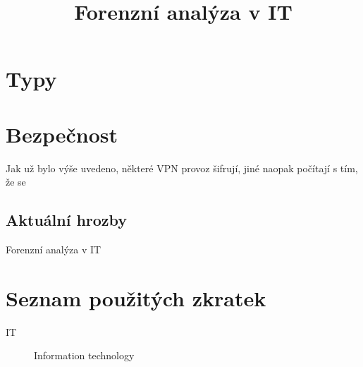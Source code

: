 \documentclass[thesis=B,czech]{FITthesis}[2012/06/26]
\title{Forenzní analýza v IT}
\begin{document}

\begin{introduction}
  \label{sec:uvod}

  

\end{introduction}

\chapter{Typy}

       \cite{cisco_intro}

\chapter{Bezpečnost}

Jak už bylo výše uvedeno, některé VPN provoz šifrují, jiné naopak počítají s tím, že se 

  \section{Aktuální hrozby}

  
\begin{conclusion}
 Forenzní analýza v IT
\end{conclusion}




\appendix

\chapter{Seznam použitých zkratek}
\begin{description}

    \item[IT] Information technology


\end{description}
\end{document}
